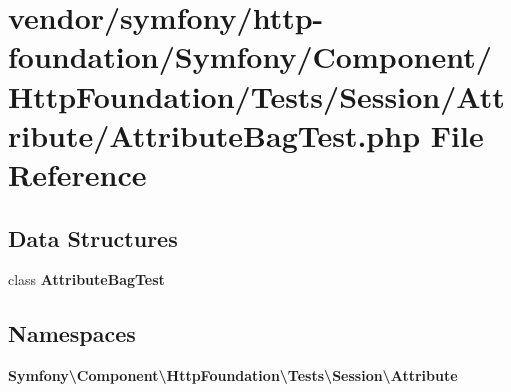 \section{vendor/symfony/http-\/foundation/\+Symfony/\+Component/\+Http\+Foundation/\+Tests/\+Session/\+Attribute/\+Attribute\+Bag\+Test.php File Reference}
\label{_attribute_bag_test_8php}
\subsection*{Data Structures}
\begin{DoxyCompactItemize}
\item 
class {\bf Attribute\+Bag\+Test}
\end{DoxyCompactItemize}
\subsection*{Namespaces}
\begin{DoxyCompactItemize}
\item 
 {\bf Symfony\textbackslash{}\+Component\textbackslash{}\+Http\+Foundation\textbackslash{}\+Tests\textbackslash{}\+Session\textbackslash{}\+Attribute}
\end{DoxyCompactItemize}
